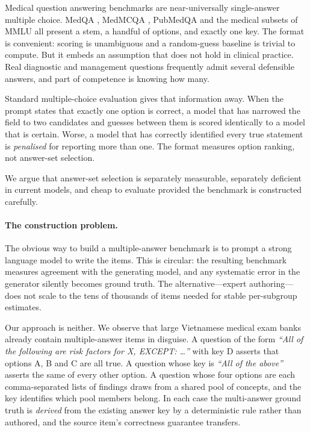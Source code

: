 \documentclass{article} %
\begin{document}
Medical question answering benchmarks are near-universally single-answer multiple
choice. MedQA \citep{jin2021medqa}, MedMCQA \citep{pal2022medmcqa}, PubMedQA
\citep{jin2019pubmedqa} and the medical subsets of MMLU \citep{hendrycks2021mmlu} all
present a stem, a handful of options, and exactly one key. The format is convenient:
scoring is unambiguous and a random-guess baseline is trivial to compute. But it embeds
an assumption that does not hold in clinical practice. Real diagnostic and management
questions frequently admit several defensible answers, and part of competence is knowing
how many.

Standard multiple-choice evaluation gives that information away. When the prompt states
that exactly one option is correct, a model that has narrowed the field to two candidates
and guesses between them is scored identically to a model that is certain. Worse, a model
that has correctly identified every true statement is \emph{penalised} for reporting more
than one. The format measures option ranking, not answer-set selection.

We argue that answer-set selection is separately measurable, separately deficient in
current models, and cheap to evaluate provided the benchmark is constructed carefully.

\paragraph{The construction problem.} The obvious way to build a multiple-answer
benchmark is to prompt a strong language model to write the items. This is circular: the
resulting benchmark measures agreement with the generating model, and any systematic
error in the generator silently becomes ground truth. The alternative---expert
authoring---does not scale to the tens of thousands of items needed for stable
per-subgroup estimates.

Our approach is neither. We observe that large Vietnamese medical exam banks already
contain multiple-answer items in disguise. A question of the form \emph{``All of the
following are risk factors for X, EXCEPT: \ldots''} with key D asserts that options A, B
and C are all true. A question whose key is \emph{``All of the above''} asserts the same
of every other option. A question whose four options are each comma-separated lists of
findings draws from a shared pool of concepts, and the key identifies which pool members
belong. In each case the multi-answer ground truth is \emph{derived} from the existing
answer key by a deterministic rule rather than authored, and the source item's
correctness guarantee transfers.
\end{document}
